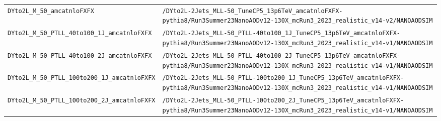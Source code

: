 \begin{longtable}{@{}>{\RaggedRight\arraybackslash}p{} >{\RaggedRight\arraybackslash}p{}@{}}
\addlinespace[2pt]
\texttt{DYto2L\_\allowbreak{}M\_\allowbreak{}50\_\allowbreak{}amcatnloFXFX} & \texttt{/\allowbreak{}DYto2L-\allowbreak{}2Jets\_\allowbreak{}MLL-\allowbreak{}50\_\allowbreak{}TuneCP5\_\allowbreak{}13p6TeV\_\allowbreak{}amcatnloFXFX-\allowbreak{}pythia8/\allowbreak{}Run3Summer23NanoAODv12-\allowbreak{}130X\_\allowbreak{}mcRun3\_\allowbreak{}2023\_\allowbreak{}realistic\_\allowbreak{}v14-\allowbreak{}v2/\allowbreak{}NANOAODSIM} \\
\addlinespace[2pt]
\texttt{DYto2L\_\allowbreak{}M\_\allowbreak{}50\_\allowbreak{}PTLL\_\allowbreak{}40to100\_\allowbreak{}1J\_\allowbreak{}amcatnloFXFX} & \texttt{/\allowbreak{}DYto2L-\allowbreak{}2Jets\_\allowbreak{}MLL-\allowbreak{}50\_\allowbreak{}PTLL-\allowbreak{}40to100\_\allowbreak{}1J\_\allowbreak{}TuneCP5\_\allowbreak{}13p6TeV\_\allowbreak{}amcatnloFXFX-\allowbreak{}pythia8/\allowbreak{}Run3Summer23NanoAODv12-\allowbreak{}130X\_\allowbreak{}mcRun3\_\allowbreak{}2023\_\allowbreak{}realistic\_\allowbreak{}v14-\allowbreak{}v1/\allowbreak{}NANOAODSIM} \\
\addlinespace[2pt]
\texttt{DYto2L\_\allowbreak{}M\_\allowbreak{}50\_\allowbreak{}PTLL\_\allowbreak{}40to100\_\allowbreak{}2J\_\allowbreak{}amcatnloFXFX} & \texttt{/\allowbreak{}DYto2L-\allowbreak{}2Jets\_\allowbreak{}MLL-\allowbreak{}50\_\allowbreak{}PTLL-\allowbreak{}40to100\_\allowbreak{}2J\_\allowbreak{}TuneCP5\_\allowbreak{}13p6TeV\_\allowbreak{}amcatnloFXFX-\allowbreak{}pythia8/\allowbreak{}Run3Summer23NanoAODv12-\allowbreak{}130X\_\allowbreak{}mcRun3\_\allowbreak{}2023\_\allowbreak{}realistic\_\allowbreak{}v14-\allowbreak{}v1/\allowbreak{}NANOAODSIM} \\
\addlinespace[2pt]
\texttt{DYto2L\_\allowbreak{}M\_\allowbreak{}50\_\allowbreak{}PTLL\_\allowbreak{}100to200\_\allowbreak{}1J\_\allowbreak{}amcatnloFXFX} & \texttt{/\allowbreak{}DYto2L-\allowbreak{}2Jets\_\allowbreak{}MLL-\allowbreak{}50\_\allowbreak{}PTLL-\allowbreak{}100to200\_\allowbreak{}1J\_\allowbreak{}TuneCP5\_\allowbreak{}13p6TeV\_\allowbreak{}amcatnloFXFX-\allowbreak{}pythia8/\allowbreak{}Run3Summer23NanoAODv12-\allowbreak{}130X\_\allowbreak{}mcRun3\_\allowbreak{}2023\_\allowbreak{}realistic\_\allowbreak{}v14-\allowbreak{}v1/\allowbreak{}NANOAODSIM} \\
\addlinespace[2pt]
\texttt{DYto2L\_\allowbreak{}M\_\allowbreak{}50\_\allowbreak{}PTLL\_\allowbreak{}100to200\_\allowbreak{}2J\_\allowbreak{}amcatnloFXFX} & \texttt{/\allowbreak{}DYto2L-\allowbreak{}2Jets\_\allowbreak{}MLL-\allowbreak{}50\_\allowbreak{}PTLL-\allowbreak{}100to200\_\allowbreak{}2J\_\allowbreak{}TuneCP5\_\allowbreak{}13p6TeV\_\allowbreak{}amcatnloFXFX-\allowbreak{}pythia8/\allowbreak{}Run3Summer23NanoAODv12-\allowbreak{}130X\_\allowbreak{}mcRun3\_\allowbreak{}2023\_\allowbreak{}realistic\_\allowbreak{}v14-\allowbreak{}v1/\allowbreak{}NANOAODSIM} \\

\end{longtable}
